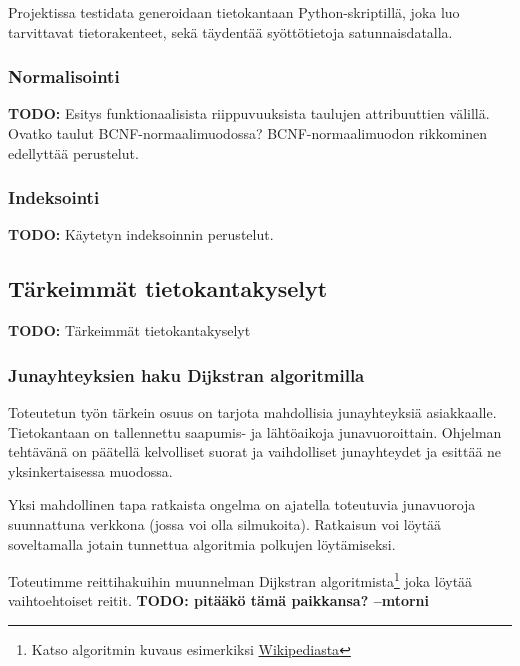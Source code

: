 \documentclass[a4paper,twoside,titlepage,12pt]{article}
\begin{document}
Projektissa testidata generoidaan tietokantaan Python-skriptillä, joka luo tarvittavat tietorakenteet, sekä täydentää syöttötietoja satunnaisdatalla.

\subsubsection{Normalisointi}
\textbf{TODO:} Esitys funktionaalisista riippuvuuksista taulujen attribuuttien välillä. Ovatko taulut BCNF-normaalimuodossa? BCNF-normaalimuodon rikkominen edellyttää perustelut. 

\subsubsection{Indeksointi}
\textbf{TODO:} Käytetyn indeksoinnin perustelut.

\subsection{Tärkeimmät tietokantakyselyt}
\textbf{TODO:} Tärkeimmät tietokantakyselyt

\subsubsection{Junayhteyksien haku Dĳkstran algoritmilla}
Toteutetun työn tärkein osuus on tarjota mahdollisia junayhteyksiä asiakkaalle. Tietokantaan on tallennettu saapumis- ja lähtöaikoja junavuoroittain. Ohjelman tehtävänä on päätellä kelvolliset suorat ja vaihdolliset junayhteydet ja esittää ne yksinkertaisessa muodossa.

Yksi mahdollinen tapa ratkaista ongelma on ajatella toteutuvia junavuoroja suunnattuna verkkona (jossa voi olla silmukoita). Ratkaisun voi löytää soveltamalla jotain tunnettua algoritmia polkujen löytämiseksi.

Toteutimme reittihakuihin muunnelman Dĳkstran algoritmista\footnote{Katso algoritmin kuvaus esimerkiksi \href{http://fi.wikipedia/Dijkstran\_algoritmi}{Wikipediasta}} joka löytää vaihtoehtoiset reitit. \textbf{TODO: pitääkö tämä paikkansa? --mtorni} 
\end{document}
